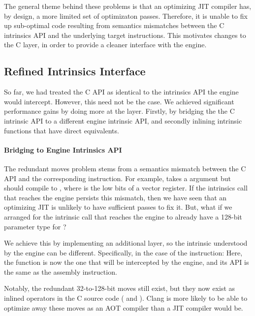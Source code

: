 The general theme behind these problems is that an optimizing JIT compiler has,
by design, a more limited set of optimizaton passes. Therefore, it is unable to
fix up sub-optimal code resulting from semantics mismatches between the C
intrinsics API and the underlying target instructions. This motivates changes to
the C layer, in order to provide a cleaner interface with the \wasm engine.

\subsection{Refined Intrinsics Interface}
\label{sec:refined}

So far, we had treated the C API as identical to the intrinsics API the engine
would intercept. However, this need not be the case. We achieved significant
performance gains by doing more at the  layer. Firstly, by
bridging the the C intrinsic API to a different engine intrinsic API, and
secondly inlining intrinsic functions that have direct \wasm equivalents.

\newcommand{\changeargmap}{Bridging to Engine Intrinsics API}
\paragraph{\changeargmap}

The redundant moves problem stems from a semantics mismatch between the C API
and the corresponding instruction.  For example,  takes a
 argument but should compile to ,
where  is the low bits of a vector register. If the intrinsics call
that reaches the \wasm engine persists this mismatch, then we have seen that an
optimizing JIT is unlikely to have sufficient passes to fix it. But, what if we
arranged for the intrinsic call that reaches the engine to already have a
128-bit parameter type for ?

We achieve this by implementing an additional layer, so the intrinsic understood
by the engine can be different. Specifically, in the case of the 
instruction:
%
%
Here, the  function is now the one that will be
intercepted by the engine, and its API is the same as the assembly instruction.

Notably, the redundant 32-to-128-bit moves still exist, but they now exist as
inlined \wasm operators in the C source code ( and
). Clang is more likely to be able to optimize away
these moves as an AOT compiler than a JIT compiler would be.

